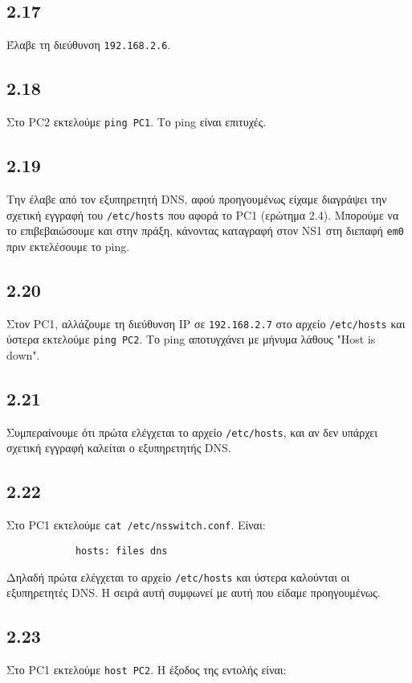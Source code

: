 \documentclass[a4paper, 12pt]{article}
\begin{document}
	\subsection*{2.17}
		Έλαβε τη διεύθυνση \verb|192.168.2.6|.

	\subsection*{2.18}
		Στο PC2 εκτελούμε \verb|ping PC1|. Το ping είναι επιτυχές.

	\subsection*{2.19} 
		Την έλαβε από τον εξυπηρετητή DNS, αφού προηγουμένως είχαμε διαγράψει την σχετική εγγραφή του \verb|/etc/hosts| που αφορά το PC1 (ερώτημα 2.4). Μπορούμε να το επιβεβαιώσουμε και στην πράξη, κάνοντας καταγραφή στον NS1 στη διεπαφή \verb|em0| πριν εκτελέσουμε το ping. 

	\subsection*{2.20}
		Στον PC1, αλλάζουμε τη διεύθυνση IP σε \verb|192.168.2.7| στο αρχείο \verb|/etc/hosts| και ύστερα εκτελούμε \verb|ping PC2|. Το ping αποτυγχάνει με μήνυμα λάθους "Host is down".

	\subsection*{2.21}
		Συμπεραίνουμε ότι πρώτα ελέγχεται το αρχείο \verb|/etc/hosts|, και αν δεν υπάρχει σχετική εγγραφή καλείται ο εξυπηρετητής DNS.

	\subsection*{2.22}
		Στο PC1 εκτελούμε \verb|cat /etc/nsswitch.conf|. Είναι:
		
		\begin{verbatim}
			hosts: files dns
		\end{verbatim}
		
		Δηλαδή πρώτα ελέγχεται το αρχείο \verb|/etc/hosts| και ύστερα καλούνται οι εξυπηρετητές DNS. Η σειρά αυτή συμφωνεί με αυτή που είδαμε προηγουμένως.

	\subsection*{2.23}
		Στο PC1 εκτελούμε \verb|host PC2|. Η έξοδος της εντολής είναι:
		
\end{document}
